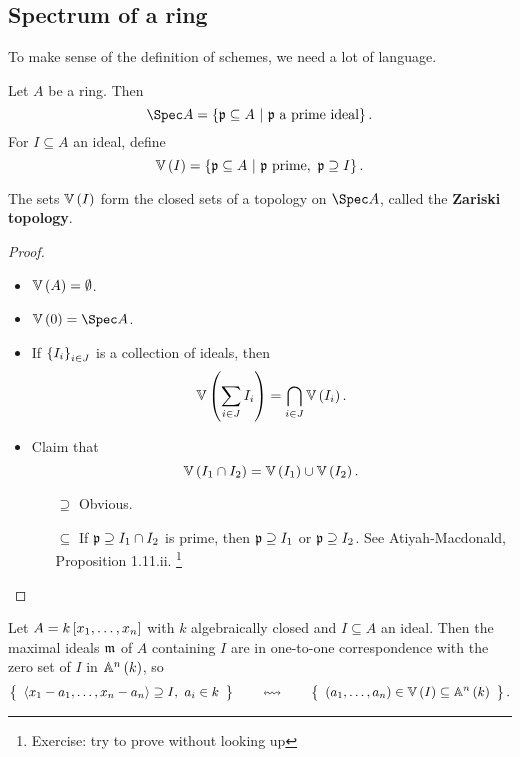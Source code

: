 \subsection{Spectrum of a ring}

To make sense of the definition of schemes, we need a lot of language.

\begin{definition*}
Let $ A $ be a ring. Then
$$ \Spec A = \cbr{\ppp \subseteq A \st \ppp \ \text{a prime ideal}}. $$
For $ I \subseteq A $ an ideal, define
$$ \VV\br{I} = \cbr{\ppp \subseteq A \st \ppp \ \text{prime}, \ \ppp \supseteq I}. $$
\end{definition*}

\begin{proposition}
The sets $ \VV\br{I} $ form the closed sets of a topology on $ \Spec A $, called the \textbf{Zariski topology}.
\end{proposition}

\begin{proof}
\hfill
\begin{itemize}
\item $ \VV\br{A} = \emptyset $.
\item $ \VV\br{0} = \Spec A $.
\item If $ \cbr{I_i}_{i \in J} $ is a collection of ideals, then
$$ \VV\br{\sum_{i \in J} I_i} = \bigcap_{i \in J} \VV\br{I_i}. $$
\item Claim that
$$ \VV\br{I_1 \cap I_2} = \VV\br{I_1} \cup \VV\br{I_2}. $$
\begin{itemize}
\item[$ \supseteq $] Obvious.
\item[$ \subseteq $] If $ \mathfrak{p} \supseteq I_1 \cap I_2 $ is prime, then $ \mathfrak{p} \supseteq I_1 $ or $ \mathfrak{p} \supseteq I_2 $. See Atiyah-Macdonald, Proposition 1.11.ii. \footnote{Exercise: try to prove without looking up}
\end{itemize}
\end{itemize}
\end{proof}

\begin{example*}
Let $ A = k\sbr{x_1, \dots, x_n} $ with $ k $ algebraically closed and $ I \subseteq A $ an ideal. Then the maximal ideals $ \mathfrak{m} $ of $ A $ containing $ I $ are in one-to-one correspondence with the zero set of $ I $ in $ \AA^n\br{k} $, so
$$ \correspondence{\abr{x_1 - a_1, \dots, x_n - a_n} \supseteq I, \ a_i \in k}{\br{a_1, \dots, a_n} \in \VV\br{I} \subseteq \AA^n\br{k}}. $$
\end{example*}

